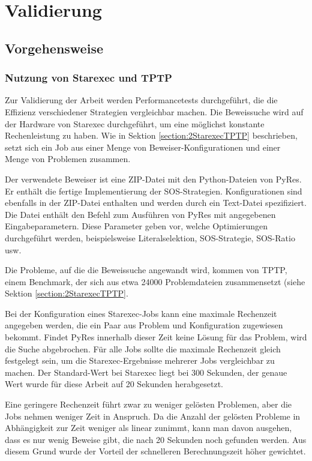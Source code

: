 
\chapter{Validierung}

\section{Vorgehensweise}
	\subsection{Nutzung von Starexec und TPTP}
		Zur Validierung der Arbeit werden Performancetests durchgeführt, die die Effizienz verschiedener Strategien vergleichbar machen.	Die Beweissuche wird auf der Hardware von Starexec durchgeführt, um eine möglichst konstante Rechenleistung zu haben. Wie in Sektion \ref{section:2StarexecTPTP} beschrieben, setzt sich ein Job aus einer Menge von Beweiser-Konfigurationen und einer Menge von Problemen zusammen. 
		
		Der verwendete Beweiser ist eine ZIP-Datei mit den Python-Dateien von PyRes. Er enthält die fertige Implementierung der SOS-Strategien. Konfigurationen sind ebenfalls in der ZIP-Datei enthalten und werden durch ein Text-Datei spezifiziert. Die Datei enthält den Befehl zum Ausführen von PyRes mit angegebenen Eingabeparametern. Diese Parameter geben vor, welche Optimierungen durchgeführt werden, beispielsweise Literalselektion, SOS-Strategie, SOS-Ratio usw.
		
		Die Probleme, auf die die Beweissuche angewandt wird, kommen von TPTP, einem Benchmark, der sich aus etwa 24000 Problemdateien zusammensetzt (siehe Sektion \ref{section:2StarexecTPTP}.
		
		Bei der Konfiguration eines Starexec-Jobs kann eine	maximale Rechenzeit angegeben werden, die ein Paar aus Problem und Konfiguration zugewiesen bekommt. Findet PyRes innerhalb dieser Zeit keine Lösung für das Problem, wird die Suche abgebrochen. Für alle Jobs sollte die maximale Rechenzeit gleich festgelegt sein, um die Starexec-Ergebnisse mehrerer Jobs vergleichbar zu machen. Der Standard-Wert bei Starexec liegt bei 300 Sekunden, der genaue Wert wurde für diese Arbeit auf 20 Sekunden herabgesetzt.
		
		Eine geringere Rechenzeit führt zwar zu weniger gelösten Problemen, aber die Jobs nehmen weniger Zeit in Anspruch. Da die Anzahl der gelösten Probleme in Abhängigkeit zur Zeit weniger als linear zunimmt, kann man davon ausgehen, dass es nur wenig Beweise gibt, die nach 20 Sekunden noch gefunden werden. Aus diesem Grund wurde der Vorteil der schnelleren Berechnungszeit höher gewichtet.
	
